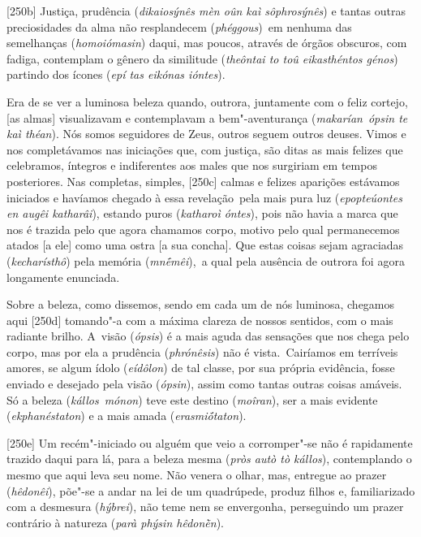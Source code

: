 [250b] Justiça, prudência (\emph{dikaiosýnês mèn oûn kaì
sôphrosýnês}) e tantas outras preciosidades da alma não resplandecem
(\emph{phéggous})~em nenhuma das semelhanças (\emph{homoiómasin}) daqui,
mas poucos, através de órgãos obscuros, com fadiga, contemplam o gênero
da similitude (\emph{theôntai to toû eikasthéntos génos}) partindo dos
ícones (\emph{epí tas eikónas ióntes}).

Era de se ver a luminosa beleza quando, outrora, juntamente com o feliz
cortejo, [as almas] visualizavam e contemplavam a bem"-aventurança
(\emph{makarían}~\emph{ópsin te kaì théan}). Nós somos seguidores de
Zeus, outros seguem outros deuses. Vimos e nos completávamos nas
iniciações que, com justiça, são ditas as mais felizes que celebramos,
íntegros e indiferentes aos males que nos surgiriam em tempos
posteriores. Nas completas, simples, [250c] calmas e felizes
aparições estávamos iniciados e havíamos chegado à essa revelação~pela
mais pura luz (\emph{epopteúontes en augêi katharâi}), estando puros
(\emph{katharoì óntes}), pois não havia a marca que nos é trazida pelo
que agora chamamos corpo, motivo pelo qual permanecemos atados [a
ele] como uma ostra [a sua concha]. Que estas coisas sejam
agraciadas (\emph{kecharísthô}) pela memória (\emph{mnḗmêi}),~a qual
pela ausência de outrora foi agora longamente enunciada.

Sobre a beleza, como dissemos, sendo em cada um de nós luminosa,
chegamos aqui [250d] tomando"-a com a máxima clareza de nossos
sentidos, com o mais radiante brilho. A~visão (\emph{ópsis}) é a mais
aguda das sensações que nos chega pelo corpo, mas por ela a prudência
(\emph{phrónêsis}) não é vista.~Cairíamos em terríveis amores, se algum
ídolo (\emph{eídôlon}) de tal classe, por sua própria evidência, fosse
enviado e desejado pela visão (\emph{ópsin}), assim como tantas outras
coisas amáveis. Só a beleza (\emph{kállos}~\emph{mónon}) teve este
destino (\emph{moîran}), ser a mais evidente (\emph{ekphanéstaton}) e a
mais amada (\emph{erasmiṓtaton}).

[250e] Um recém"-iniciado ou alguém que veio a corromper"-se não é
rapidamente trazido daqui para lá, para a beleza mesma (\emph{pròs autò
tò kállos}), contemplando o mesmo que aqui leva seu nome. Não venera o
olhar, mas, entregue ao prazer (\emph{hêdonêi}), põe"-se a andar na lei de
um quadrúpede, produz filhos e, familiarizado com a desmesura
(\emph{hýbrei}), não teme nem se envergonha, perseguindo um prazer
contrário à natureza (\emph{parà phýsin hêdonḕn}).

